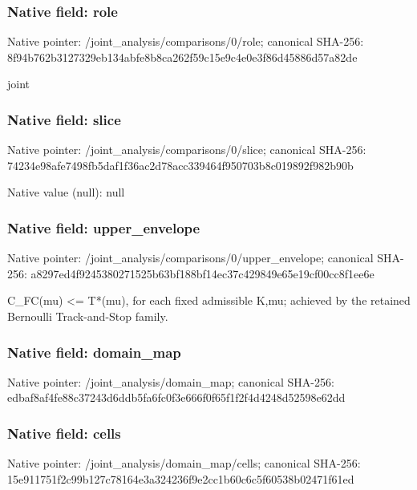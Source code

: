 \documentclass[10pt,a4paper]{article}
\begin{document}
\subsubsection{Native field: role}
Native pointer: /joint\_\allowbreak{}analysis/comparisons/0/role; canonical SHA-256: 8f94b762b3127329eb134abfe8b8ca262f59c15e9c4e0e3f86d45886d57a82de

\begingroup\raggedright\sloppy joint\par\endgroup

\subsubsection{Native field: slice}
Native pointer: /joint\_\allowbreak{}analysis/comparisons/0/slice; canonical SHA-256: 74234e98afe7498fb5daf1f36ac2d78acc339464f950703b8c019892f982b90b

Native value (null): null

\subsubsection{Native field: upper\_\allowbreak{}envelope}
Native pointer: /joint\_\allowbreak{}analysis/comparisons/0/upper\_\allowbreak{}envelope; canonical SHA-256: a8297ed4f9245380271525b63bf188bf14ec37c429849e65e19cf00cc8f1ee6e

\begingroup\raggedright\sloppy C\_\allowbreak{}FC(mu) <=\allowbreak{} T*(mu),\allowbreak{} for each fixed admissible K,\allowbreak{}mu;\allowbreak{} achieved by the retained Bernoulli Track-and-Stop family.\par\endgroup

\subsubsection{Native field: domain\_\allowbreak{}map}
Native pointer: /joint\_\allowbreak{}analysis/domain\_\allowbreak{}map; canonical SHA-256: edbaf8af4fe88c37243d6ddb5fa6fc0f3e666f0f65f1f2f4d4248d52598e62dd

\subsubsection{Native field: cells}
Native pointer: /joint\_\allowbreak{}analysis/domain\_\allowbreak{}map/cells; canonical SHA-256: 15e911751f2c99b127c78164e3a324236f9e2cc1b60c6c5f60538b02471f61ed
\end{document}
